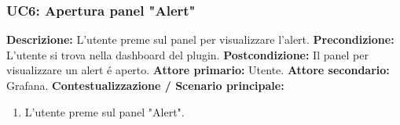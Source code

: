                 \subsubsection{UC6: Apertura panel "Alert"}
                    \textbf{Descrizione:} L’utente preme sul panel per visualizzare l'alert.
                    \newline
                    \textbf{Precondizione:} L'utente si trova nella dashboard del plugin.
                    \newline
                    \textbf{Postcondizione:} Il panel per visualizzare un alert é aperto.
                    \newline
                    \textbf{Attore primario:} Utente.
                    \newline
                    \textbf{Attore secondario:} Grafana.
                    \newline
                    \textbf{Contestualizzazione / Scenario principale:} \begin{enumerate}
                            \item L’utente preme sul panel "Alert".
                        \end{enumerate}   
                    
                        
                        
                     		
